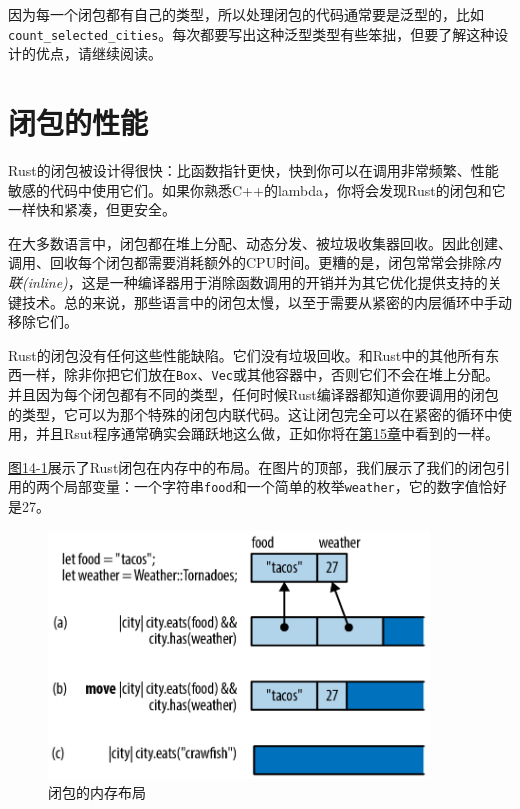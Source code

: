 因为每一个闭包都有自己的类型，所以处理闭包的代码通常要是泛型的，比如\\
\texttt{count\_selected\_cities}。每次都要写出这种泛型类型有些笨拙，但要了解这种设计的优点，请继续阅读。

\section{闭包的性能}

Rust的闭包被设计得很快：比函数指针更快，快到你可以在调用非常频繁、性能敏感的代码中使用它们。如果你熟悉C++的lambda，你将会发现Rust的闭包和它一样快和紧凑，但更安全。

在大多数语言中，闭包都在堆上分配、动态分发、被垃圾收集器回收。因此创建、调用、回收每个闭包都需要消耗额外的CPU时间。更糟的是，闭包常常会排除\emph{内联(inline)}，这是一种编译器用于消除函数调用的开销并为其它优化提供支持的关键技术。总的来说，那些语言中的闭包太慢，以至于需要从紧密的内层循环中手动移除它们。

Rust的闭包没有任何这些性能缺陷。它们没有垃圾回收。和Rust中的其他所有东西一样，除非你把它们放在\texttt{Box}、\texttt{Vec}或其他容器中，否则它们不会在堆上分配。并且因为每个闭包都有不同的类型，任何时候Rust编译器都知道你要调用的闭包的类型，它可以为那个特殊的闭包内联代码。这让闭包完全可以在紧密的循环中使用，并且Rsut程序通常确实会踊跃地这么做，正如你将在\hyperref[ch15]{第15章}中看到的一样。

\hyperref[f14-1]{图14-1}展示了Rust闭包在内存中的布局。在图片的顶部，我们展示了我们的闭包引用的两个局部变量：一个字符串\texttt{food}和一个简单的枚举\texttt{weather}，它的数字值恰好是27。

\begin{figure}[htbp]
    \centering
    \includegraphics[width=0.9\textwidth]{../img/f14-1.png}
    \caption{闭包的内存布局}
    \label{f14-1}
\end{figure}

